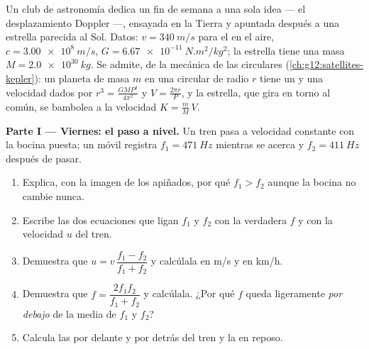 \begin{problem}
\label{pb:g12:doppler-effect:1}
Un club de astronomía dedica un fin de semana a una sola idea --- el
desplazamiento Doppler ---, ensayada en la Tierra y apuntada después a
una estrella parecida al Sol. Datos: $v = \qty{340}{m/s}$ para el 
en el aire, $c = \qty{3.00e8}{m/s}$,
$G = \qty{6.67e-11}{N.m^2/kg^2}$; la estrella tiene una masa
$M = \qty{2.0e30}{kg}$. Se admite, de la mecánica de las 
circulares (\cref{ch:g12:satellites-kepler}): un planeta de masa $m$ en
una  circular de radio $r$ tiene un  y una velocidad dados
por $r^3 = \frac{G M P^2}{4\pi^2}$ y $V = \frac{2\pi r}{P}$, y la
estrella, que gira en torno al  común, se bambolea a la
velocidad $K = \frac{m}{M}\,V$.

\medskip
\noindent\textbf{Parte I --- Viernes: el paso a nivel.}
Un tren pasa a velocidad constante con la bocina puesta; un móvil
registra $f_1 = \qty{471}{Hz}$ mientras se acerca y
$f_2 = \qty{411}{Hz}$ después de pasar.
\begin{enumerate}
  \item Explica, con la imagen de los  apiñados, por qué
        $f_1 > f_2$ aunque la bocina no cambie nunca.
  \item Escribe las dos ecuaciones que ligan $f_1$ y $f_2$ con la
         verdadera $f$ y con la velocidad $u$ del tren.
  \item Demuestra que $u = v\,\dfrac{f_1 - f_2}{f_1 + f_2}$ y calcúlala
        en \unit{m/s} y en \unit{km/h}.
  \item Demuestra que $f = \dfrac{2 f_1 f_2}{f_1 + f_2}$ y calcúlala.
        ¿Por qué $f$ queda ligeramente \emph{por debajo} de la media de
        $f_1$ y $f_2$?
  \item Calcula las  por delante y por detrás del tren
        y la  en reposo.
\end{enumerate}


\end{problem}
